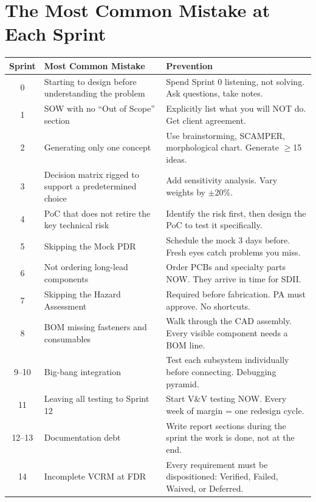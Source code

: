 \documentclass[11pt,letterpaper]{article}
\begin{document}
\section{The Most Common Mistake at Each Sprint}

\begin{center}\small
\begin{longtable}{c p{4cm} p{6cm}}
\toprule
\textbf{Sprint} & \textbf{Most Common Mistake} & \textbf{Prevention} \\
\midrule
\endhead
0 & Starting to design before understanding the problem & Spend Sprint 0 listening, not solving. Ask questions, take notes. \\
1 & SOW with no ``Out of Scope'' section & Explicitly list what you will NOT do. Get client agreement. \\
2 & Generating only one concept & Use brainstorming, SCAMPER, morphological chart. Generate $\geq$15 ideas. \\
3 & Decision matrix rigged to support a predetermined choice & Add sensitivity analysis. Vary weights by $\pm$20\%. \\
4 & PoC that does not retire the key technical risk & Identify the risk first, then design the PoC to test it specifically. \\
5 & Skipping the Mock PDR & Schedule the mock 3 days before. Fresh eyes catch problems you miss. \\
6 & Not ordering long-lead components & Order PCBs and specialty parts NOW. They arrive in time for SDII. \\
\midrule
7 & Skipping the Hazard Assessment & Required before fabrication. PA must approve. No shortcuts. \\
8 & BOM missing fasteners and consumables & Walk through the CAD assembly. Every visible component needs a BOM line. \\
9--10 & Big-bang integration & Test each subsystem individually before connecting. Debugging pyramid. \\
11 & Leaving all testing to Sprint 12 & Start V\&V testing NOW. Every week of margin = one redesign cycle. \\
12--13 & Documentation debt & Write report sections during the sprint the work is done, not at the end. \\
14 & Incomplete VCRM at FDR & Every requirement must be dispositioned: Verified, Failed, Waived, or Deferred. \\
\bottomrule
\end{longtable}
\end{center}
\end{document}
